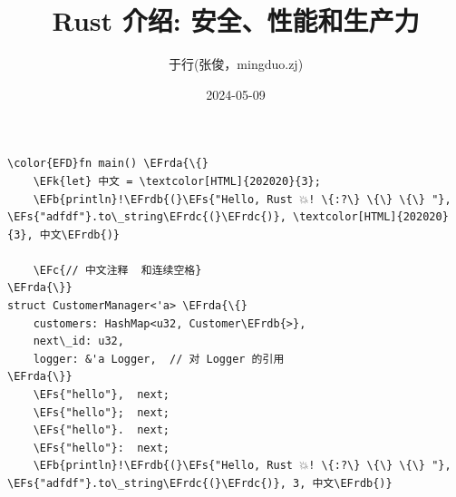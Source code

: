 \documentclass[lang=cn,11pt,a4paper,table,fontset=none]{ctexart}
\author{于行(张俊，mingduo.zj)}
\date{2024-05-09}
\title{Rust 介绍: 安全、性能和生产力}
\newcommand{\EFc}[1]{\textcolor{EFc}{\textit{#1}}} %
\newcommand{\EFs}[1]{\textcolor{EFs}{#1}} %
\newcommand{\EFk}[1]{\textcolor{EFk}{\textbf{#1}}} %
\newcommand{\EFb}[1]{\textcolor{EFb}{\textbf{#1}}} %
\newcommand{\EFrda}[1]{\textcolor{EFrda}{#1}} %
\newcommand{\EFrdb}[1]{\textcolor{EFrdb}{#1}} %
\newcommand{\EFrdc}[1]{\textcolor{EFrdc}{#1}} %
\begin{document}
\begin{Code}
\begin{Verbatim}
\color{EFD}fn main() \EFrda{\{}
    \EFk{let} 中文 = \textcolor[HTML]{202020}{3};
    \EFb{println}!\EFrdb{(}\EFs{"Hello, Rust 💥! \{:?\} \{\} \{\} "}, \EFs{"adfdf"}.to\_string\EFrdc{(}\EFrdc{)}, \textcolor[HTML]{202020}{3}, 中文\EFrdb{)}

    \EFc{// 中文注释  和连续空格}
\EFrda{\}}
struct CustomerManager<'a> \EFrda{\{}
    customers: HashMap<u32, Customer\EFrdb{>},
    next\_id: u32,
    logger: &'a Logger,  // 对 Logger 的引用
\EFrda{\}}
    \EFs{"hello"},  next;
    \EFs{"hello"};  next;
    \EFs{"hello"}.  next;
    \EFs{"hello"}:  next;
    \EFb{println}!\EFrdb{(}\EFs{"Hello, Rust 💥! \{:?\} \{\} \{\} "},  \EFs{"adfdf"}.to\_string\EFrdc{(}\EFrdc{)}, 3, 中文\EFrdb{)}
\end{Verbatim}
\end{Code}
\end{document}
